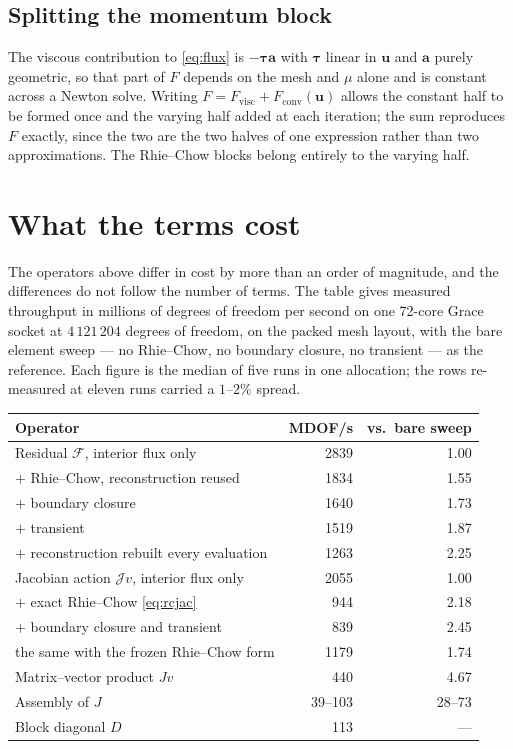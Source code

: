 \documentclass[11pt,a4paper]{article}
\newcommand{\bu}{\mathbf{u}}
\newcommand{\ba}{\mathbf{a}}
\newcommand{\bttau}{\boldsymbol{\tau}}
\begin{document}
\subsection{Splitting the momentum block}

The viscous contribution to \eqref{eq:flux} is $-\bttau\ba$ with $\bttau$ linear in $\bu$ and
$\ba$ purely geometric, so that part of $F$ depends on the mesh and $\mu$ alone and is
constant across a Newton solve. Writing $F = F_{\mathrm{visc}} + F_{\mathrm{conv}}(\bu)$
allows the constant half to be formed once and the varying half added at each iteration; the
sum reproduces $F$ exactly, since the two are the two halves of one expression rather than two
approximations. The Rhie--Chow blocks belong entirely to the varying half.

\section{What the terms cost}
\label{sec:cost}

The operators above differ in cost by more than an order of magnitude, and the differences do
not follow the number of terms. The table gives measured throughput in millions of degrees of
freedom per second on one 72-core Grace socket at $4\,121\,204$ degrees of freedom, on the
packed mesh layout, with the bare element sweep --- no Rhie--Chow, no boundary closure, no
transient --- as the reference. Each figure is the median of five runs in one allocation; the
rows re-measured at eleven runs carried a $1$--$2\%$ spread.

\begin{center}
\begin{tabular}{lrr}
\toprule
Operator & MDOF/s & vs.\ bare sweep \\
\midrule
Residual $\mathcal{F}$, interior flux only            & 2839 & 1.00 \\
\quad $+$ Rhie--Chow, reconstruction reused           & 1834 & 1.55 \\
\quad $+$ boundary closure                            & 1640 & 1.73 \\
\quad $+$ transient                                   & 1519 & 1.87 \\
\quad $+$ reconstruction rebuilt every evaluation     & 1263 & 2.25 \\
\midrule
Jacobian action $\mathcal{J}v$, interior flux only    & 2055 & 1.00 \\
\quad $+$ exact Rhie--Chow \eqref{eq:rcjac}           &  944 & 2.18 \\
\quad $+$ boundary closure and transient              &  839 & 2.45 \\
\quad the same with the frozen Rhie--Chow form        & 1179 & 1.74 \\
\midrule
Matrix--vector product $Jv$                           &  440 & 4.67 \\
Assembly of $J$                                       & 39--103 & 28--73 \\
Block diagonal $D$                                    &  113 & --- \\
\bottomrule
\end{tabular}
\end{center}
\end{document}

